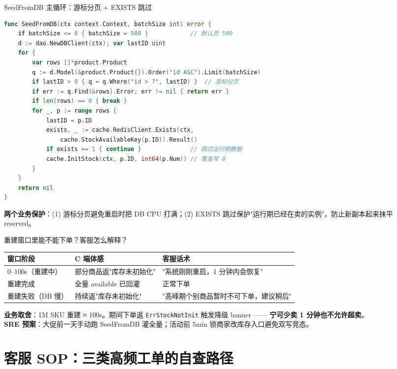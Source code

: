 \documentclass[aspectratio=169,11pt]{beamer}
\begin{document}
\begin{frame}{SeedFromDB 主循环：游标分页 + EXISTS 跳过}
\begin{lstlisting}[language=Go,firstnumber=14,
  caption={}]
func SeedFromDB(ctx context.Context, batchSize int) error {
    if batchSize <= 0 { batchSize = 500 }            // 默认页 500
    d := dao.NewDBClient(ctx); var lastID uint
    for {
        var rows []*product.Product
        q := d.Model(&product.Product{}).Order("id ASC").Limit(batchSize)
        if lastID > 0 { q = q.Where("id > ?", lastID) }  // 游标分页
        if err := q.Find(&rows).Error; err != nil { return err }
        if len(rows) == 0 { break }
        for _, p := range rows {
            lastID = p.ID
            exists, _ := cache.RedisClient.Exists(ctx,
                cache.StockAvailableKey(p.ID)).Result()
            if exists == 1 { continue }              // 跳过运行期数据
            cache.InitStock(ctx, p.ID, int64(p.Num)) // 覆盖写 0
        }
    }
    return nil
}
\end{lstlisting}
\small \textbf{两个业务保护}：(1) 游标分页避免重启时把 DB CPU 打满；(2) EXISTS 跳过保护"运行期已经在卖的实例"，防止新副本起来抹平 reserved。
\end{frame}

\begin{frame}[shrink]{重建窗口里能不能下单？客服怎么解释？}
\begin{tabular}{@{}lp{4.0cm}p{4cm}@{}}
\toprule
窗口阶段 & C 端体感 & 客服话术 \\
\midrule
0--100s（重建中） & 部分商品返"库存未初始化" & "系统刚刚重启，1 分钟内会恢复" \\
重建完成 & 全量 available 已回灌 & 正常下单 \\
重建失败（DB 慢） & 持续返"库存未初始化" & "高峰期个别商品暂时不可下单，建议稍后" \\
\bottomrule
\end{tabular}
\vspace{2mm}
\small \textbf{业务取舍}：1M SKU 重建 ≈ 100s。期间下单返 \texttt{ErrStockNotInit} 触发降级 banner —— \textbf{宁可少卖 1 分钟也不允许超卖}。\\
\textbf{SRE 预案}：大促前一天手动跑 SeedFromDB 灌全量；活动前 5min 锁商家改库存入口避免双写竞态。
\end{frame}

\section{客服 SOP：三类高频工单的自查路径}
\end{document}
